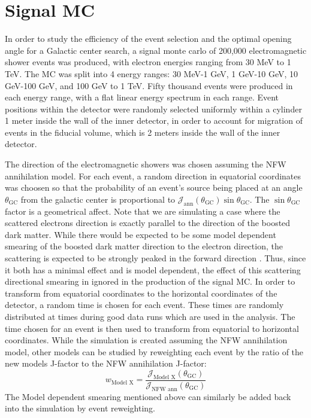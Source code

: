 \section{Signal MC}
\label{sec:signal_mc}
In order to study the efficiency of the event selection and the optimal opening angle for a Galactic center search, a signal monte carlo of 200,000 electromagnetic shower events was produced, with electron energies ranging from 30 MeV to 1 TeV.  The MC was split into 4 energy ranges: 30 MeV-1 GeV, 1 GeV-10 GeV, 10 GeV-100 GeV, and 100 GeV to 1 TeV.  Fifty thousand events were produced in each energy range, with a flat linear energy spectrum in each range.  Event positions within the detector were randomly selected uniformly within a cylinder 1 meter inside the wall of the inner detector, in order to account for migration of events in the fiducial volume, which is 2 meters inside the wall of the inner detector.  

The direction of the electromagnetic showers was chosen assuming the NFW annihilation model.  For each event, a random direction in equatorial coordinates was choosen so that the probability of an event's source being placed at an angle $\theta_\textrm{GC}$ from the galactic center is proportional to $\mathcal{J}_\textrm{ann}(\theta_{\textrm{GC}}) \sin \theta_{\textrm{GC}}$.  The $\sin \theta_{\textrm{GC}}$ factor is a geometrical affect.  Note that we are simulating a case where the scattered electrons direction is exactly parallel to the direction of the boosted dark matter.  While there would be expected to be some model dependent smearing of the boosted dark matter direction to the electron direction, the scattering is expected to be strongly peaked in the forward direction \cite{Agashe:2014yua}.  Thus, since it both has a minimal effect and is model dependent, the effect of this scattering directional smearing in ignored in the production of the signal MC.  In order to transform from equatorial coordinates to the horizontal coordinates of the detector, a random time is chosen for each event.  These times are randomly distributed at times during 
\SK good data runs which are used in the analysis.  The time chosen for an event is then used to transform from equatorial to horizontal coordinates.  While the simulation is created assuming the NFW annihilation model, other models can be studied by reweighting each event by the ratio of the new models J-factor to the NFW annihilation J-factor:
\begin{equation}
w_{\textrm{Model X}}=\frac{\mathcal{J}_{\textrm{Model X}}(\theta_\textrm{GC})}{\mathcal{J}_{\textrm{NFW ann}}(\theta_\textrm{GC})}
\label{eq:model_weight}
\end{equation} 
The Model dependent smearing mentioned above can similarly be added back into the simulation by event reweighting.


